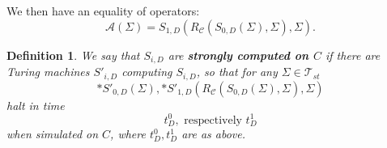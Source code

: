 \documentclass[9pt,twocolumn,twoside,lineno]{pnas-new}
\numberwithin{equation}{section}
\newtheorem{definition}[equation]{Definition}
\theoremstyle{definition}
\theoremstyle{remark}
\begin{document}
We then have an equality of operators:
\begin{equation} \label{eq:A}
   \mathcal{A} (\Sigma)=  S   _{1,D}  (R _{\mathcal{C}} (S    _{0,D} (\Sigma), \Sigma), \Sigma).
\end{equation}


\begin{definition} \label{def:stronglycomputed}
 We say that $S _{i,D}  $ are \textbf{\emph{strongly computed on $C$}} if there are Turing machines $S' _{i,D} $ computing $S _{i,D} $,  so that for any $\Sigma \in \mathcal{T} _{st} $  
$$*S' _{0,D} (\Sigma ),  *S' _{1,D}  (R _{\mathcal{C}} (S _{0,D} (\Sigma), \Sigma), \Sigma)$$
halt in time  $$t ^{0} _{D},  \text { respectively } t ^{1} _{D}  $$ when simulated on $C$,
where $t _{D}  ^{0}, t _{D}  ^{1}   $ are as above. 
  \end{definition}
\end{document}
